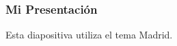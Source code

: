 \documentclass{beamer}
\begin{document}
\begin{frame}
	\frametitle{Mi Presentación}
	Esta diapositiva utiliza el tema Madrid.
\end{frame}
\end{document}
